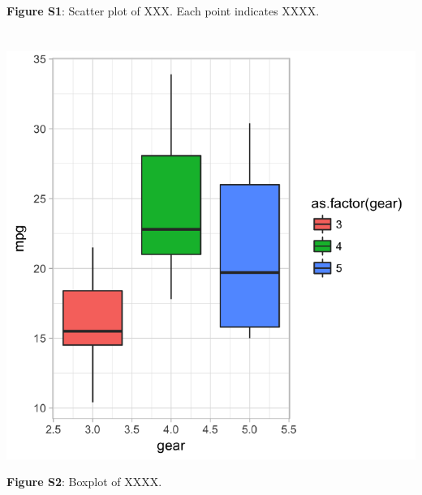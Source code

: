\documentclass[12pt,]{article}
\begin{document}
\textbf{Figure S1}: Scatter plot of XXX. Each point indicates XXXX.

\newpage

\hypertarget{section-2}{%
\section{}\label{section-2}}

\includegraphics{main_text_files/figure-latex/boxplt-1.pdf}

\textbf{Figure S2}: Boxplot of XXXX.



\newpage
\singlespacing
\end{document}
